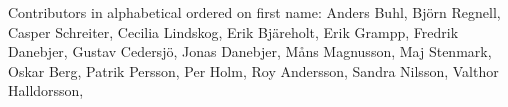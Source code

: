Contributors in alphabetical ordered on first name:
Anders Buhl,
Björn Regnell,
Casper Schreiter,
Cecilia Lindskog,
Erik Bjäreholt,
Erik Grampp,
Fredrik Danebjer,
Gustav Cedersjö,
Jonas Danebjer, 
Måns Magnusson,
Maj Stenmark,
Oskar Berg,
Patrik Persson,
Per Holm,
Roy Andersson,
Sandra Nilsson,
Valthor Halldorsson, 